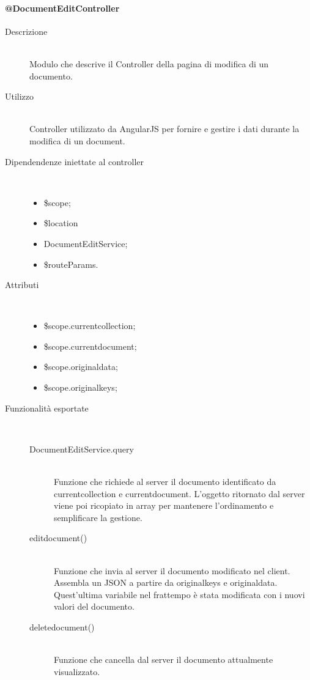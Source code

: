 \paragraph{@DocumentEditController}
\begin{description}
 \item[Descrizione] \hfill \\
 Modulo che descrive il Controller della pagina di modifica di un documento.
 
 \item[Utilizzo] \hfill \\
 Controller utilizzato da AngularJS per fornire e gestire i dati durante la modifica di un document.
 
 \item[Dipendendenze iniettate al controller] \hfill \\
 \begin{itemize}
  \item \$scope;
  \item \$location
  \item DocumentEditService;
  \item \$routeParams.
  
 \end{itemize}
 
 \item[Attributi] \hfill \\
 \begin{itemize}
 \item  \$scope.current\textunderscore collection;
    \item  \$scope.current\textunderscore document;
    \item  \$scope.original\textunderscore data;
    \item  \$scope.original\textunderscore keys;
 \end{itemize}
 
 \item[Funzionalità esportate] \hfill \\
 \begin{description}
  \item[DocumentEditService.query] \hfill \\
  Funzione che richiede al server il documento identificato da current\textunderscore collection e current\textunderscore document.
  L'oggetto ritornato dal server viene poi ricopiato in array per mantenere l'ordinamento e semplificare la gestione.
  \item[edit\textunderscore document()] \hfill \\
  Funzione che invia al server il documento modificato nel client.
  Assembla un JSON a partire da original\textunderscore keys e original\textunderscore data. Quest'ultima variabile nel frattempo è stata 
  modificata con i nuovi valori del documento.
  \item[delete\textunderscore document()] \hfill \\
  Funzione che cancella dal server il documento attualmente visualizzato.
 \end{description}
\end{description}

